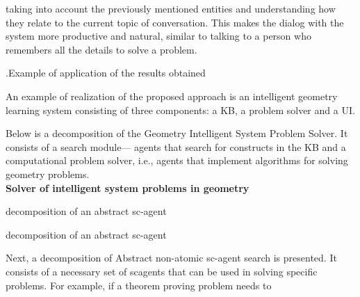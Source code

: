\documentclass[10pt,a4paper,twocolumn]{article}
\date{}
\title{}
\newcommand{\RomanNumeralCaps}[1]
{\MakeUppercase{\romannumeral #1}}
\begin{document}
\maketitle
taking into account the previously mentioned entities
and understanding how they relate to the current topic
of conversation. This makes the dialog with the system
more productive and natural, similar to talking to a
person who remembers all the details to solve a problem.
\vspace{0.2cm}
\par \RomanNumeralCaps{3}.Example of application of the results obtained
\vspace{0.2cm}
\par An example of realization of the proposed approach
is an intelligent geometry learning system consisting of
three components: a KB, a problem solver and a UI.
\par Below is a decomposition of the Geometry Intelligent
System Problem Solver. It consists of a search module---
agents that search for constructs in the KB and a computational problem solver, i.e., agents that implement algorithms for solving geometry problems.
\vspace{0.3cm}
\\ \textbf{Solver of intelligent system problems in geometry}
\begin{scnrelfromset}{\hspace{-0.6cm} decomposition of an abstract sc-agent}
\begin{scnrelfromset}{\hspace{-0.5cm}decomposition of an abstract sc-agent}
      \end{scnrelfromset}
\end{scnrelfromset}
Next, a decomposition of Abstract non-atomic sc-agent search is presented. It consists of a necessary set of scagents that can be used in solving specific problems. For example, if a theorem proving problem needs to
\end{document}
